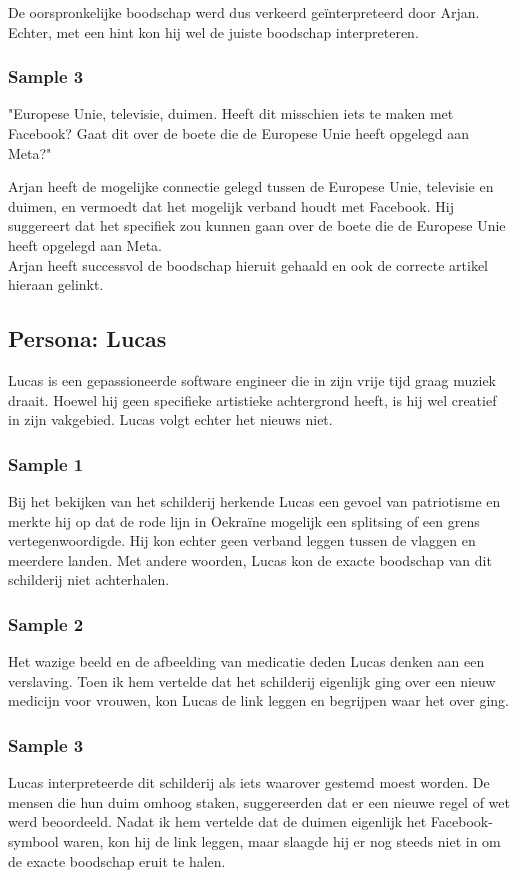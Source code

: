 De oorspronkelijke boodschap werd dus verkeerd geïnterpreteerd door Arjan. Echter, met een hint kon hij wel de juiste boodschap interpreteren.

\subsubsection{Sample 3}
"Europese Unie, televisie, duimen. Heeft dit misschien iets te maken met Facebook? Gaat dit over de boete die de Europese Unie heeft opgelegd aan Meta?"

Arjan heeft de mogelijke connectie gelegd tussen de Europese Unie, televisie en duimen, en vermoedt dat het mogelijk verband houdt met Facebook. Hij suggereert dat het specifiek zou kunnen gaan over de boete die de Europese Unie heeft opgelegd aan Meta. \\

Arjan heeft successvol de boodschap hieruit gehaald en ook de correcte artikel hieraan gelinkt. 


\subsection{Persona: Lucas}
Lucas is een gepassioneerde software engineer die in zijn vrije tijd graag muziek draait. Hoewel hij geen specifieke artistieke achtergrond heeft, is hij wel creatief in zijn vakgebied. Lucas volgt echter het nieuws niet.
\subsubsection{Sample 1}
Bij het bekijken van het schilderij herkende Lucas een gevoel van patriotisme en merkte hij op dat de rode lijn in Oekraïne mogelijk een splitsing of een grens vertegenwoordigde. Hij kon echter geen verband leggen tussen de vlaggen en meerdere landen. Met andere woorden, Lucas kon de exacte boodschap van dit schilderij niet achterhalen.
\subsubsection{Sample 2}
Het wazige beeld en de afbeelding van medicatie deden Lucas denken aan een verslaving. Toen ik hem vertelde dat het schilderij eigenlijk ging over een nieuw medicijn voor vrouwen, kon Lucas de link leggen en begrijpen waar het over ging.
\subsubsection{Sample 3}
Lucas interpreteerde dit schilderij als iets waarover gestemd moest worden. De mensen die hun duim omhoog staken, suggereerden dat er een nieuwe regel of wet werd beoordeeld. Nadat ik hem vertelde dat de duimen eigenlijk het Facebook-symbool waren, kon hij de link leggen, maar slaagde hij er nog steeds niet in om de exacte boodschap eruit te halen.


